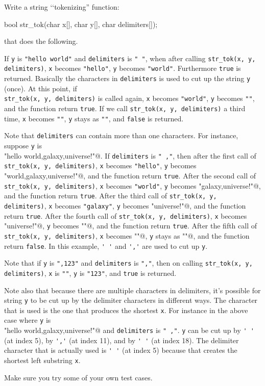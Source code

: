 Write a string \lq\lq tokenizing'' function:
\begin{console}
bool str_tok(char x[], char y[], char delimiters[]);
\end{console}
that does the following.

If \verb!y! is \verb!"hello world"! and
\texttt{delimiters} is \verb!" "!, when
after calling \verb!str_tok(x, y, delimiters)!,
\verb!x! becomes \texttt{"hello"},
\verb!y! becomes \verb!"world"!.
Furthermore \verb!true! is returned.
Basically the characters in \verb!delimiters! is used to cut up
the string \verb!y! (once).
At this point, if 
\\
\verb!str_tok(x, y, delimiters)!
is called again,
\verb!x! becomes \verb!"world"!,
\verb!y! becomes \verb!""!,
and the function return \verb!true!.
If we call \verb!str_tok(x, y, delimiters)!
a third time,
\verb!x! becomes \verb!""!,
\verb!y! stays as \verb!""!,
and \verb!false! is returned.

Note that \verb!delimiters! can contain more than one characters.
For instance, suppose
\verb!y! is
\\ \verb@"hello world,galaxy,universe!"@.
If \verb!delimiters! is \verb!" ,"!,
then
after the first call of
\\ \verb!str_tok(x, y, delimiters)!,
\verb!x! becomes \verb!"hello"!,
\verb!y! becomes \verb@"world,galaxy,universe!"@,
and the function return \verb!true!.
After the second call of
\verb!str_tok(x, y, delimiters)!,
\verb!x! becomes \verb!"world"!,
\verb!y! becomes \verb@"galaxy,universe!"@,
and the function return \verb!true!.
After the third call of
\verb!str_tok(x, y, delimiters)!,
\verb!x! becomes \verb!"galaxy"!,
\verb!y! becomes \verb@"universe!"@,
and the function return \verb!true!.
After the fourth call of
\verb!str_tok(x, y, delimiters)!,
\verb!x! becomes \verb@"universe!"@,
\verb!y! becomes \verb@""@,
and the function return \verb!true!.
After the fifth call of
\verb!str_tok(x, y, delimiters)!,
\verb!x! becomes \verb@""@,
\verb!y! stays as \verb@""@,
and the function return \verb!false!.
In this example, \verb!' '! and \verb!','! are used to cut up
\verb!y!.

Note that if \verb!y! is \verb!",123"!
and \verb!delimiters! is \verb!","!,
then on calling 
\verb!str_tok(x, y, delimiters)!,
\verb!x! is \verb!""!,
\verb!y! is \verb!"123"!,
and
\verb!true! is returned.

Note also that
 because there are multiple characters in delimiters,
 it's possible for string \verb!y! to be cut up by
 the delimiter characters in different ways.
 The character that is used is the one that produces the
 shortest \verb!x!.
 For instance in the above case where
 \verb!y! is
 \\
 \verb@"hello world,galaxy,universe!"@
 and
 \verb!delimiters! is
 \verb!" ,"!.
 \verb!y! can be cut up by \verb!' '! (at index 5),
 by \verb!','! (at index 11), and
 by \verb!' '! (at index 18).
 The delimiter character that is actually used is \verb!' '! (at index 5)
 because
 that creates the shortest left substring \verb!x!.

Make sure you try some of your own test cases.

